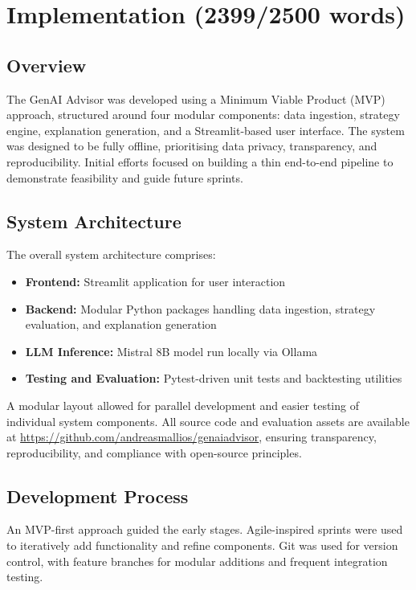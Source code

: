 \section{Implementation (2399/2500 words)}

\subsection{Overview}

The GenAI Advisor was developed using a Minimum Viable Product (MVP) approach, structured around four modular components: data ingestion, strategy engine, explanation generation, and a Streamlit-based user interface. The system was designed to be fully offline, prioritising data privacy, transparency, and reproducibility. Initial efforts focused on building a thin end-to-end pipeline to demonstrate feasibility and guide future sprints.

\subsection{System Architecture}

The overall system architecture comprises:
\begin{itemize}
    \item \textbf{Frontend:} Streamlit application for user interaction
    \item \textbf{Backend:} Modular Python packages handling data ingestion, strategy evaluation, and explanation generation
    \item \textbf{LLM Inference:} Mistral 8B model run locally via Ollama
    \item \textbf{Testing and Evaluation:} Pytest-driven unit tests and backtesting utilities
\end{itemize}

A modular layout allowed for parallel development and easier testing of individual system components. All source code and evaluation assets are available at \url{https://github.com/andreasmallios/genaiadvisor}, ensuring transparency, reproducibility, and compliance with open-source principles.

\subsection{Development Process}

An MVP-first approach guided the early stages. Agile-inspired sprints were used to iteratively add functionality and refine components. Git was used for version control, with feature branches for modular additions and frequent integration testing.

